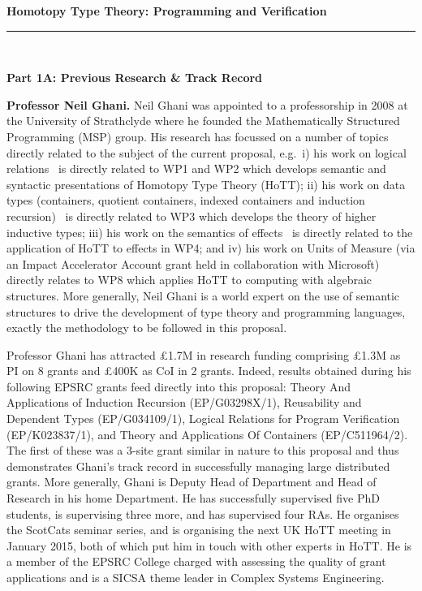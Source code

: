 \documentclass[a4paper,11pt]{article}
\newcommand{\eg}{{e.g.}\ }
\begin{document}
\thispagestyle{plain}
\begin{center}
  {\Large {\bf Homotopy Type Theory: Programming and Verification}}\\[1ex] 

\vspace*{-0.1in}

  \rule{140mm}{.5mm}\\[2ex]
\end{center}

\noindent
{\bf \Large Part 1A: Previous Research \& Track Record}

\textbf{Professor Neil Ghani.} Neil Ghani was appointed to a
professorship in 2008 at the University of Strathclyde where he
founded the Mathematically Structured Programming (MSP) group. His
research has focussed on a number of topics directly related to the
subject of the current proposal, \eg i) his work on logical
relations~\cite{neil2014relParamDep} is directly related to WP1 and
WP2 which develops semantic and syntactic presentations of Homotopy
Type Theory (HoTT); ii) his work on data types (containers, quotient
containers, indexed containers and induction
recursion)~\cite{alti:mpc04,altenkirchGhaniHancockMcBrideMorris:indexedContainers,alti:cont-tcs}
is directly related to WP3 which develops the theory of higher
inductive types; iii) his work on the semantics of effects~\cite{atkeyGhaniJacobsJohann:effects} is
directly related to the application of HoTT to effects in WP4; and iv)
his work on Units of Measure (via an Impact Accelerator Account grant
held in collaboration with Microsoft) directly relates to WP8 which
applies HoTT to computing with algebraic structures. More generally,
Neil Ghani is a world expert on the use of semantic structures to
drive the development of type theory and programming languages,
exactly the methodology to be followed in this proposal.

Professor Ghani has attracted \pounds 1.7M in research funding
comprising \pounds 1.3M as PI on 8 grants and \pounds 400K as CoI in 2
grants.  Indeed, results obtained during his following EPSRC grants
feed directly into this proposal: Theory And Applications of Induction
Recursion (EP/G03298X/1), Reusability and Dependent Types
(EP/G034109/1), Logical Relations for Program Verification
(EP/K023837/1), and Theory and Applications Of Containers
(EP/C511964/2). The first of these was a 3-site grant similar in
nature to this proposal and thus demonstrates Ghani's track record in
successfully managing large distributed grants. More generally, Ghani
is Deputy Head of Department and Head of Research in his home
Department. He has successfully supervised five PhD students, is
supervising three more, and has supervised four
RAs. He organises the ScotCats seminar series, and is organising the next
UK HoTT meeting in January 2015, both of which put him in touch with
other experts in HoTT. He is a member of the EPSRC College charged
with assessing the quality of grant applications and is a SICSA theme leader in
Complex Systems Engineering.
\end{document}
